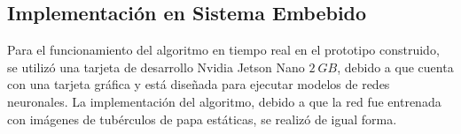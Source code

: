 \newpage
	\subsection{Implementación en Sistema Embebido}
	
	Para el funcionamiento del algoritmo en tiempo real en el prototipo construido, se utilizó una tarjeta de desarrollo Nvidia Jetson Nano $2 \ GB$, debido a que cuenta con una tarjeta gráfica y está diseñada para ejecutar modelos de redes neuronales. La implementación del algoritmo, debido a que la red fue entrenada con imágenes de tubérculos de papa estáticas, se realizó de igual forma.\\
	
		
	












